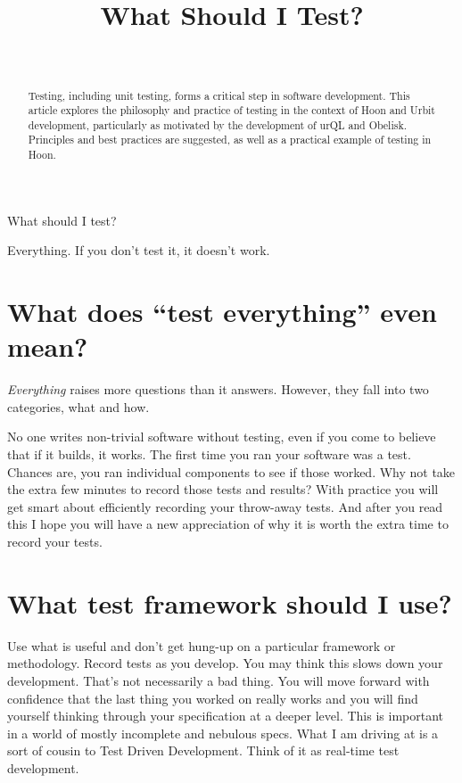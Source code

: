 \documentclass[twoside]{article}
\title{What Should I Test?}
\author{\authorname~\authorpatp \\ \affiliation}
\date{}
\begin{document}
\maketitle
\thispagestyle{firststyle}

\begin{abstract}
Testing, including unit testing, forms a critical step in software development.  This article explores the philosophy and practice of testing in the context of Hoon and Urbit development, particularly as motivated by the development of urQL and Obelisk.  Principles and best practices are suggested, as well as a practical example of testing in Hoon.
\end{abstract}

\setcounter{page}{1}

\tableofcontents

What should I test?

Everything.  If you don't test it, it doesn't work.

\section{What does “test everything” even mean?}

\emph{Everything} raises more questions than it answers. However, they fall into two categories, what and how.

No one writes non-trivial software without testing, even if you come to believe that if it builds, it works. The first time you ran your software was a test. Chances are, you ran individual components to see if those worked. Why not take the extra few minutes to record those tests and results? With practice you will get smart about efficiently recording your throw-away tests. And after you read this I hope you will have a new appreciation of why it is worth the extra time to record your tests.

\section{What test framework should I use?}

Use what is useful and don't get hung-up on a particular framework or methodology. Record tests as you develop. You may think this slows down your development. That's not necessarily a bad thing. You will move forward with confidence that the last thing you worked on really works and you will find yourself thinking through your specification at a deeper level. This is important in a world of mostly incomplete and nebulous specs. What I am driving at is a sort of cousin to Test Driven Development. Think of it as real-time test development.
\end{document}
